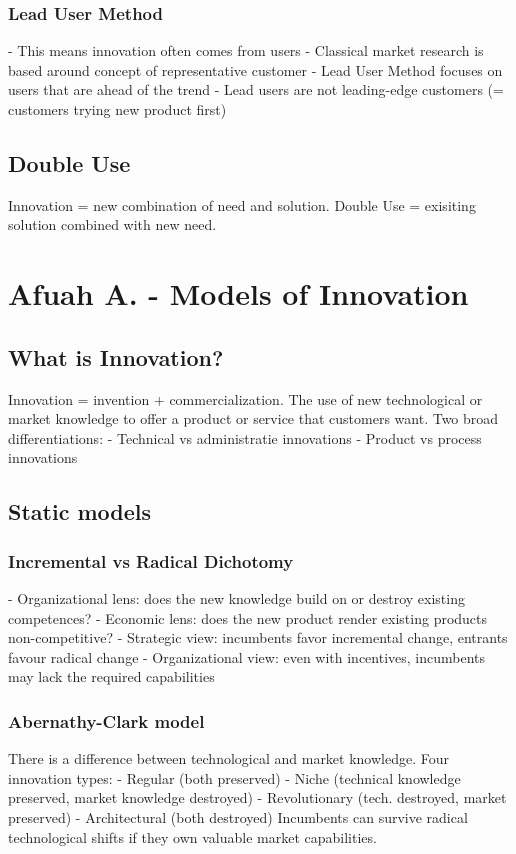 \documentclass{scrartcl}
\begin{document}
\subsubsection*{Lead User Method}
- This means innovation often comes from users
- Classical market research is based around concept of representative customer
- Lead User Method focuses on users that are ahead of the trend
- Lead users are not leading-edge customers (= customers trying new product first)
\subsection*{Double Use}
Innovation = new combination of need and solution.
Double Use = exisiting solution combined with new need.

\section*{Afuah A. - Models of Innovation}
\subsection*{What is Innovation?}
Innovation = invention + commercialization. The use of new technological or market knowledge to offer a product or service that customers want.
Two broad differentiations:
- Technical vs administratie innovations
- Product vs process innovations
\subsection*{Static models}
\subsubsection*{Incremental vs Radical Dichotomy}
- Organizational lens: does the new knowledge build on or destroy existing competences?
- Economic lens: does the new product render existing products non-competitive?
- Strategic view: incumbents favor incremental change, entrants favour radical change
- Organizational view: even with incentives, incumbents may lack the required capabilities
\subsubsection*{Abernathy-Clark model}
There is a difference between technological and market knowledge.
Four innovation types:
- Regular (both preserved)
- Niche (technical knowledge preserved, market knowledge destroyed)
- Revolutionary (tech. destroyed, market preserved)
- Architectural (both destroyed)
Incumbents can survive radical technological shifts if they own valuable market capabilities.
\end{document}

